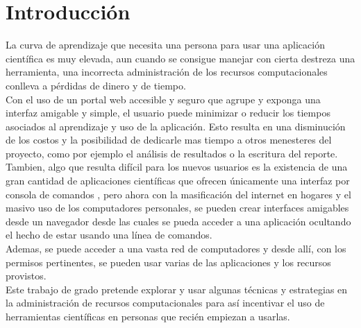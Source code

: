 \section{Introducción}


La curva de aprendizaje que necesita una persona para usar una aplicación científica es muy elevada, aun cuando se consigue manejar con cierta destreza una herramienta, una incorrecta administración de los recursos computacionales conlleva a pérdidas de dinero y de tiempo. \\

Con el uso de un portal web accesible y seguro que agrupe y exponga una interfaz amigable y simple, el usuario puede minimizar o reducir los tiempos asociados al aprendizaje y uso de la aplicación. Esto resulta en una disminución de los costos y la posibilidad de dedicarle mas tiempo a otros menesteres del proyecto, como por ejemplo el análisis de resultados o la escritura del reporte. \\

Tambien, algo que resulta difícil para los nuevos usuarios es la existencia de una gran cantidad de aplicaciones científicas que ofrecen únicamente una interfaz por consola de comandos \cite{Shneiderman:1983}, pero ahora con la masificación del internet en  hogares y el masivo uso de los computadores personales, se pueden crear interfaces amigables desde un navegador desde las cuales se pueda acceder a una aplicación ocultando el hecho de estar usando una línea de comandos.\\

Ademas, se puede acceder a una vasta red de computadores y desde allí, con los permisos pertinentes, se pueden usar varias de las aplicaciones y los recursos provistos.\\

Este trabajo de grado pretende explorar y usar algunas técnicas y estrategias en la administración de recursos computacionales para así incentivar el uso de herramientas científicas en personas que recién empiezan a usarlas.
